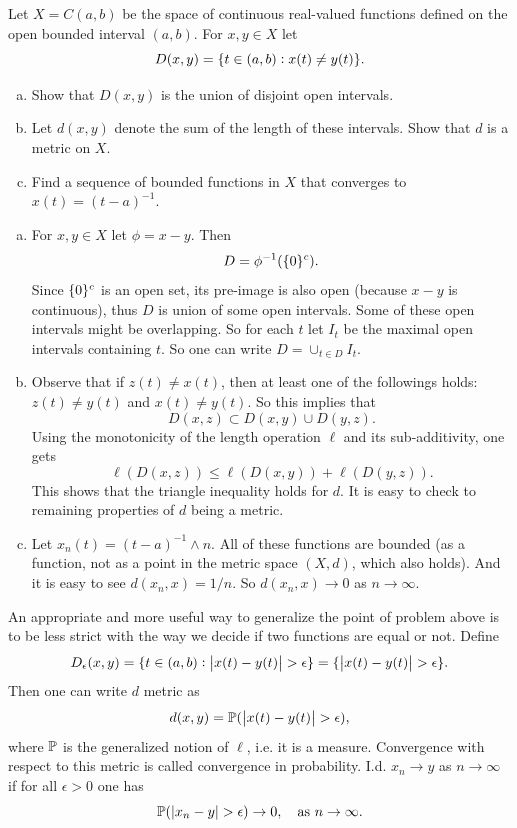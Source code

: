  
 \begin{problem}
 	Let $ X = C(a,b) $ be the space of continuous real-valued functions defined on the open bounded interval $ (a,b) $.  For $ x,y\in X $ let
 	\[ D(x,y) = \{t\in(a,b): x(t)\neq y(t)\}. \]
 	\begin{enumerate}[(a)]
 		\item Show that $ D(x,y) $ is the union of disjoint open intervals.
 		\item Let $ d(x,y) $ denote the sum of the length of these intervals. Show that $ d $ is a metric on $ X $.
 		\item Find a sequence of bounded functions in $ X $ that converges to $ x(t) = (t-a)^{-1} $.
 	\end{enumerate}
 \end{problem}
 
 \begin{solution}
 	\begin{enumerate}[(a)]
 		\item For $ x,y\in X $ let $ \phi = x-y $. Then 
 		\[ D = \phi^{-1}(\{0\}^c). \]
 		Since $ \{0\}^c $ is an open set, its pre-image is also open (because $ x-y $ is continuous), thus $ D $ is union of some open intervals. Some of these open intervals might be overlapping. So for each $ t $ let $ I_t $ be the maximal open intervals containing $ t $. So one can write $ D = \cup_{t\in D} I_t $.
 		
 		
 		\item Observe that if $ z(t) \neq x(t) $, then at least one of the followings holds: $ z(t)\neq y(t) $ and $ x(t) \neq y(t) $. So this implies that
 		\[ D(x,z) \subset D(x,y) \cup D(y,z). \]
 		Using the monotonicity of the length operation $ \ell $ and its sub-additivity, one gets
 		\[ \ell(D(x,z)) \leq \ell(D(x,y)) + \ell(D(y,z)). \]
 		This shows that the triangle inequality holds for $ d $. It is easy to check to remaining properties of $ d $ being a metric.
 		
 		\item Let $ x_n(t) = (t-a)^{-1} \wedge n $. All of these functions are bounded (as a function, not as a point in the metric space $ (X,d) $, which also holds). And it is easy to see $ d(x_n,x) = 1/n $. So $ d(x_n,x)\to 0 $ as $ n\to \infty $. 
  	\end{enumerate}
 \end{solution}
 \begin{remark}
 	An appropriate and more useful way to generalize the point of problem above is to be less strict with the way we decide if two functions are equal or not. Define
 	\[ D_\epsilon(x,y) = \set{t\in(a,b) : \abs{x(t)-y(t)}>\epsilon} = \set{\abs{x(t)-y(t)}>\epsilon}. \]
 	Then one can write $ d $ metric as
 	\[ d(x,y) = \prob(\abs{x(t)-y(t)}>\epsilon), \]
 	where $ \mathbb{P} $ is the generalized notion of $ \ell $, i.e. it is a measure. Convergence with respect to this metric is called convergence in probability. I.d. $ x_n\to y $ as $ n\to\infty $ if for all $ \epsilon>0 $ one has
 	\[ \prob(\abs{x_n-y}>\epsilon) \to 0,\quad \text{as $ n\to\infty $}.  \]
 \end{remark}
 
 
 
 
